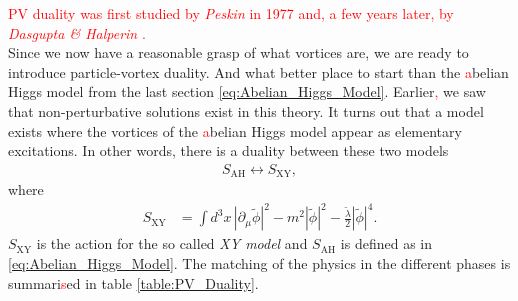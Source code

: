     \indent \textcolor{red}{PV duality was first studied by \textit{Peskin} \cite{Peskin:1977kp} in 1977 and, a few years later, by \textit{Dasgupta \& Halperin} \cite{Dasgupta:1981zz}.}\\
    \indent Since we now have a reasonable grasp of what vortices are, we are ready to introduce particle-vortex duality. And what better place to start than the \textcolor{red}{a}belian Higgs model from the last section \eqref{eq:Abelian_Higgs_Model}. Earlier\textcolor{red}{,} we saw that non-perturbative solutions exist in this theory. It turns out that a model exists where the vortices of the \textcolor{red}{a}belian Higgs model appear as elementary excitations. In other words, there is a duality between these two models
    \begin{align}
        S_{\text{AH}} \longleftrightarrow S_{\text{XY}},
    \end{align}
    where
    \begin{align}
        S_{\text{XY}} &= \int d^3x \, |\partial_{\mu}\tilde{\phi}|^2-m^2 |\tilde{\phi}|^2 - \frac{\tilde{\lambda}}{2} |\tilde{\phi}|^4.
    \end{align}
    $S_{\text{XY}}$ is the action for the so called \textit{XY model} and $S_{\text{AH}}$ is defined as in \eqref{eq:Abelian_Higgs_Model}. The matching of the physics in the different phases is summari\textcolor{red}{s}ed in table \eqref{table:PV_Duality}.
